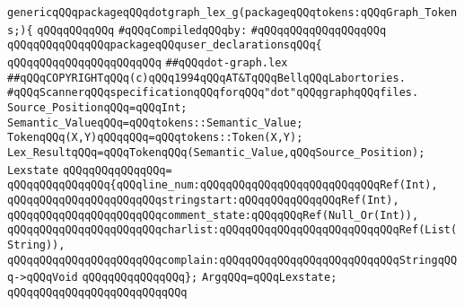 \label{src/lib/std/dot/dot-graph.lex.pkg}
\verb|genericqQQqpackageqQQqdotgraph_lex_g(packageqQQqtokens:qQQqGraph_Tokens;){|\newline
\verb|qQQqqQQqqQQq|\newline
\verb|#qQQqCompiledqQQqby:|\newline
\verb|#qQQqqQQqqQQqqQQqqQQq|\newline
\newline
\verb|qQQqqQQqqQQqqQQqpackageqQQquser_declarationsqQQq{|\newline
\verb|qQQqqQQqqQQqqQQqqQQqqQQq|\newline
\verb|##qQQqdot-graph.lex|\newline
\verb|##qQQqCOPYRIGHTqQQq(c)qQQq1994qQQqAT&TqQQqBellqQQqLabortories.|\newline
\newline
\verb|#qQQqScannerqQQqspecificationqQQqforqQQq"dot"qQQqgraphqQQqfiles.|\newline
\newline
\verb|Source_PositionqQQq=qQQqInt;|\newline
\verb|Semantic_ValueqQQq=qQQqtokens::Semantic_Value;|\newline
\verb|TokenqQQq(X,Y)qQQqqQQq=qQQqtokens::Token(X,Y);|\newline
\verb|Lex_ResultqQQq=qQQqTokenqQQq(Semantic_Value,qQQqSource_Position);|\newline
\newline
\verb|Lexstate|\newline
\verb|qQQqqQQqqQQqqQQq=|\newline
\verb|qQQqqQQqqQQqqQQq{qQQqline_num:qQQqqQQqqQQqqQQqqQQqqQQqqQQqRef(Int),|\newline
\verb|qQQqqQQqqQQqqQQqqQQqqQQqstringstart:qQQqqQQqqQQqqQQqRef(Int),|\newline
\verb|qQQqqQQqqQQqqQQqqQQqqQQqcomment_state:qQQqqQQqRef(Null_Or(Int)),|\newline
\verb|qQQqqQQqqQQqqQQqqQQqqQQqcharlist:qQQqqQQqqQQqqQQqqQQqqQQqqQQqRef(List(String)),|\newline
\verb|qQQqqQQqqQQqqQQqqQQqqQQqcomplain:qQQqqQQqqQQqqQQqqQQqqQQqqQQqStringqQQq->qQQqVoid|\newline
\verb|qQQqqQQqqQQqqQQq};|\newline
\newline
\verb|ArgqQQq=qQQqLexstate;|\newline
\verb|qQQqqQQqqQQqqQQqqQQqqQQqqQQq|\newline
